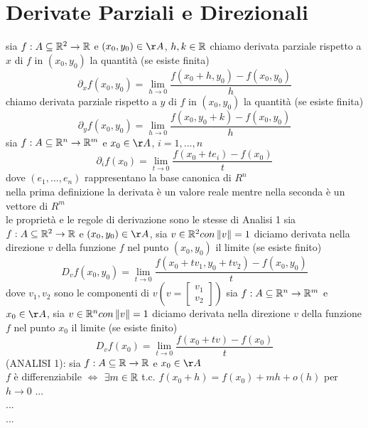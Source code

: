 \section{Derivate Parziali e Direzionali}
sia $f:A\subseteq\mathbb{R}^2\rightarrow\mathbb{R}$ e $(x_0,y_0)\in\AA$, $h,k\in\mathbb{R}$
chiamo derivata parziale rispetto a $x$ di $f$ in $(x_0,y_0)$ la quantità (se esiste finita)
$$\partial_xf(x_0,y_0) = \lim\limits_{h\rightarrow{0}}\frac{f(x_0+h,y_0)-f(x_0,y_0)}{h}$$
chiamo derivata parziale rispetto a $y$ di $f$ in $(x_0,y_0)$ la quantità (se esiste finita)
$$\partial_yf(x_0,y_0) = \lim\limits_{h\rightarrow{0}}\frac{f(x_0,y_0+k)-f(x_0,y_0)}{h}$$
sia $f:A\subseteq\mathbb{R}^n\rightarrow\mathbb{R}^m$ e $x_0\in\AA$, $i=1,...,n$
$$\partial_if(x_0) = \lim\limits_{t\rightarrow{0}}\frac{f(x_0+te_i)-f(x_0)}{t}$$
dove $(e_1,...,e_n)$ rappresentano la base canonica di $R^n$\\
\observation nella prima definizione la derivata è un valore reale mentre nella seconda è un vettore di $R^m$\\
\observation le proprietà e le regole di derivazione sono le stesse di Analisi 1
sia $f:A\subseteq\mathbb{R}^2\rightarrow\mathbb{R}$ e $(x_0,y_0)\in\AA$, sia $v\in\mathbb{R}^2 con \left\|v\right\|=1 $
diciamo derivata nella direzione $v$ della funzione $f$ nel punto $(x_0,y_0)$ il limite (se esiste finito)\\
$$D_vf(x_0,y_0) = \lim\limits_{t\rightarrow{0}}\frac{f(x_0+tv_1,y_0+tv_2)-f(x_0,y_0)}{t}$$
dove $v_1,v_2$ sono le componenti di $v(v=\begin{bmatrix}v_1\\v_2\end{bmatrix})$
sia $f:A\subseteq\mathbb{R}^n\rightarrow\mathbb{R}^m$ e $x_0\in\AA$, sia $v\in\mathbb{R}^n con \left\|v\right\|=1 $
diciamo derivata nella direzione $v$ della funzione $f$ nel punto $x_0$ il limite (se esiste finito)\\
$$D_vf(x_0) = \lim\limits_{t\rightarrow{0}}\frac{f(x_0+tv)-f(x_0)}{t}$$
\proposition
(ANALISI 1): sia $f:A\subseteq \mathbb{R}\rightarrow\mathbb{R}$ e $x_0\in\AA$\\
$f$ è differenziabile $\Leftrightarrow$ $\exists m\in \mathbb{R} $ t.c. $f(x_0+h)=f(x_0)+mh+o(h)$ per $h\rightarrow 0$
...\\
...\\
...\\

